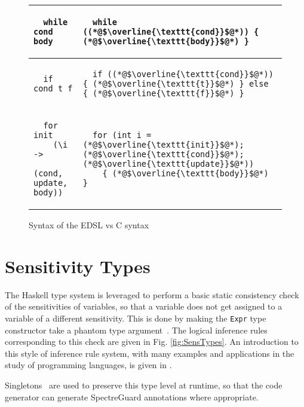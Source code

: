 \documentclass[10pt, conference]{IEEEtran}
\newcommand{\ttt}{\texttt}
\begin{document}
\begin{figure}[h]
\begin{tabular}{|l|l|}
  \hline
  \begin{lstlisting}
  while cond body
  \end{lstlisting}
  & \begin{lstlisting}
  while ((*@$\overline{\ttt{cond}}$@*)) { (*@$\overline{\ttt{body}}$@*) }
  \end{lstlisting}\\

  \hline
  \begin{lstlisting}
  if cond t f
  \end{lstlisting}
  & \begin{lstlisting}
  if ((*@$\overline{\ttt{cond}}$@*)) { (*@$\overline{\ttt{t}}$@*) } else { (*@$\overline{\ttt{f}}$@*) }
  \end{lstlisting}\\

  \hline
  \begin{lstlisting}
  for init
    (\i ->
      (cond, update, body))
  \end{lstlisting}
  & \begin{lstlisting}
  for (int i = (*@$\overline{\ttt{init}}$@*); (*@$\overline{\ttt{cond}}$@*); (*@$\overline{\ttt{update}}$@*))
    { (*@$\overline{\ttt{body}}$@*) }
  \end{lstlisting}\\


  \hline
\end{tabular}
\caption{Syntax of the EDSL vs C syntax}
\label{fig:Syntax}
\end{figure}

\section{Sensitivity Types}
The Haskell type system is leveraged to perform a basic static consistency check of the sensitivities
of variables, so that a variable does not get assigned to a variable of a different sensitivity. This
is done by making the \verb|Expr| type constructor take a phantom type argument~\cite{Phantom}. The
logical inference rules corresponding to this check are given in Fig. \ref{fig:SensTypes}. An introduction
to this style of inference rule system, with many examples and applications in the study of programming languages, is given in \cite{HarperFoundations}.

Singletons~\cite{SingletonsPaper} are used to preserve this type level at runtime, so that the
code generator can generate SpectreGuard annotations where appropriate.
\end{document}
